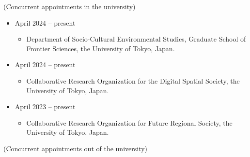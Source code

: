 \documentclass[
]{book}
\providecommand{\tightlist}{%
  \setlength{\itemsep}{0pt}\setlength{\parskip}{0pt}}
\begin{document}
(Concurrent appointments in the university)

\begin{itemize}
\tightlist
\item
  April 2024 -- present

  \begin{itemize}
  \tightlist
  \item
    Department of Socio-Cultural Environmental Studies, Graduate School of Frontier Sciences, the University of Tokyo, Japan.
  \end{itemize}
\item
  April 2024 -- present

  \begin{itemize}
  \tightlist
  \item
    Collaborative Research Organization for the Digital Spatial Society, the University of Tokyo, Japan.
  \end{itemize}
\item
  April 2023 -- present

  \begin{itemize}
  \tightlist
  \item
    Collaborative Research Organization for Future Regional Society, the University of Tokyo, Japan.
  \end{itemize}
\end{itemize}

(Concurrent appointments out of the university)
\end{document}
